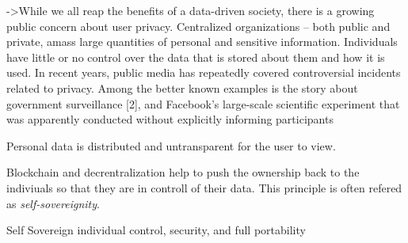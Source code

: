 ->While we all reap the benefits of a data-driven society, there
is a growing public concern about user privacy. Centralized
organizations – both public and private, amass large quantities
of personal and sensitive information. Individuals have little or
no control over the data that is stored about them and how it
is used. In recent years, public media has repeatedly covered
controversial incidents related to privacy. Among the better
known examples is the story about government surveillance
[2], and Facebook’s large-scale scientific experiment that was
apparently conducted without explicitly informing participants



Personal data is distributed and untransparent for the user to view.\cite[p. 1]{uPortWhitePaper}

Blockchain and decrentralization help to push the ownership back to the indiviuals so that they are in controll of their data. This principle is often refered as \textit{self-sovereignity}.\cite[p. 1]{uPortWhitePaper}






Self Sovereign individual control, security, and full portability
